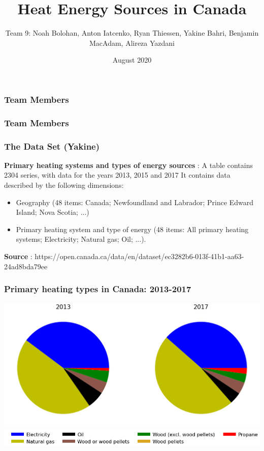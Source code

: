 \documentclass{beamer}
\title{Heat Energy Sources in Canada}
\author[Team 9]{Team 9: Noah Bolohan, Anton Iatcenko, Ryan Thiessen, Yakine Bahri, Benjamin MacAdam, Alireza Yazdani}
\institute[]{Math\textsuperscript{Industry}}
\date{August 2020}
\begin{document}
\frame{\titlepage}


\begin{frame}
\frametitle{Team Members}

\begin{minipage}[b]{0.3\textwidth}

\end{minipage}
\begin{minipage}[b]{0.7\textwidth}

\end{minipage}

\end{frame}


\begin{frame}
\frametitle{Team Members}


\end{frame}





\begin{frame}
\frametitle{The Data Set (Yakine)}
\textbf{Primary heating systems and types of energy sources} : A table contains 2304 series, with data for the years 2013, 2015 and 2017
It contains data described by the following dimensions:
\begin{itemize}
\item Geography (48 items: Canada; Newfoundland and Labrador; Prince Edward Island; Nova Scotia; ...)
\item Primary heating system and type of energy (48 items: All primary heating systems; Electricity; Natural gas; Oil; ...).
\end{itemize}
\textbf{Source} : https://open.canada.ca/data/en/dataset/ec3282b6-013f-41b1-aa63-24ad8bda79ee
\end{frame}


\begin{frame}
\frametitle{Primary heating types in Canada: 2013-2017}
\includegraphics[width=\textwidth]{Canada20132017.png}\\
\includegraphics[width=\linewidth]{leg_bar.png}
\end{frame}
\end{document}
